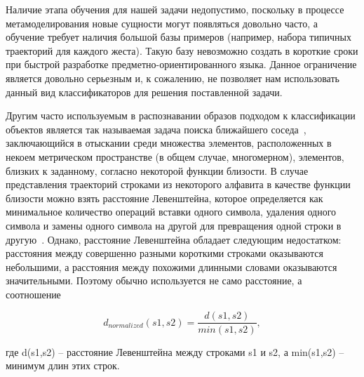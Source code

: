 \documentclass[a5paper]{article}
\begin{document}
Наличие этапа обучения для нашей задачи недопустимо, поскольку в процессе метамоделирования новые сущности могут появляться довольно часто, а обучение требует наличия большой базы примеров (например, набора типичных траекторий для каждого жеста). Такую базу невозможно создать в короткие сроки при быстрой разработке предметно-ориентированного языка. Данное ограничение является довольно серьезным и, к сожалению, не позволяет нам использовать данный вид классификаторов для решения поставленной задачи.

Другим часто используемым в распознавании образов подходом к классификации объектов является так называемая задача поиска ближайшего соседа~\cite{nns1, nns2}, заключающийся в отыскании среди множества элементов, расположенных в некоем метрическом пространстве (в общем случае, многомерном), элементов, близких к заданному, согласно некоторой функции близости. В случае представления траекторий строками из некоторого алфавита в качестве функции близости можно взять расстояние Левенштейна, которое определяется как минимальное количество операций вставки одного символа, удаления одного символа и замены одного символа на другой для превращения одной строки в другую~\cite{levenshtein}. Однако, расстояние Левенштейна обладает следующим недостатком: расстояния между совершенно разными короткими строками оказываются небольшими, а расстояния между похожими длинными словами оказываются значительными. Поэтому обычно используется не само расстояние, а соотношение 

\begin{equation}
\label{levenshtein}
d_{normalized}(s1,s2) = \frac{d(s1,s2)}{min(s1,s2)},
\end{equation}

где d(s1,s2) -- расстояние Левенштейна между строками s1 и s2, а min(s1,s2) -- минимум длин этих строк.
\end{document}
